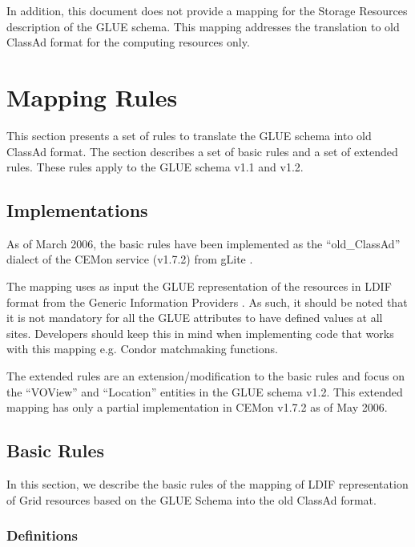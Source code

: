 \documentclass[12pt]{article}
\begin{document}
In addition, this document does not provide a mapping for the
Storage Resources description of the GLUE schema. This mapping
addresses the translation to old ClassAd format for the computing
resources only.

\section{Mapping Rules}
\label{se:MappingRules} This section presents a set of rules to
translate the GLUE schema into old ClassAd format. The section
describes a set of basic rules and a set of extended rules. These
rules apply to the GLUE schema v1.1 and v1.2.

\subsection{Implementations}
\label{se:Implementations} As of March 2006, the basic rules have
been implemented as the ``old\_ClassAd'' dialect of the CEMon
service (v1.7.2) from gLite \cite{CEMon}.

The mapping uses as input the GLUE representation of the resources
in LDIF format \cite{LDIF-mapping,LDIF} from the Generic Information
Providers \cite{GIP}. As such, it should be noted that it is not
mandatory for all the GLUE attributes to have defined values at all
sites. Developers should keep this in mind when implementing code
that works with this mapping e.g. Condor matchmaking functions.

The extended rules are an extension/modification to the basic rules and
focus on the ``VOView'' and ``Location'' entities in the GLUE schema v1.2.
This extended mapping has only a partial implementation in CEMon v1.7.2
as of May 2006.


\subsection{Basic Rules}
\label{se:BasicRules}

In this section, we describe the basic rules of the mapping of LDIF
representation of Grid resources based on the GLUE Schema into the
old ClassAd format.

\subsubsection{Definitions}
\end{document}
